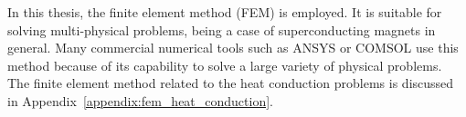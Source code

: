 In this thesis, the finite element method (FEM) is employed. It is suitable for solving multi-physical problems, being a case of superconducting magnets in general. Many commercial numerical tools such as ANSYS or COMSOL use this method because of its capability to solve a large variety of physical problems. The finite element method related to the heat conduction problems is discussed in Appendix~\ref{appendix:fem_heat_conduction}.

